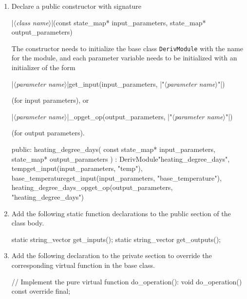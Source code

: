\documentclass{article}\usepackage[]{graphicx}\usepackage[]{color}
\newcommand{\code}[1]{\lstinline[style=C++style]{#1}}
\newcommand{\placeholder}[1]{$\langle$\textrm{\textit{#1}}$\rangle$}
\newcommand{\stringplaceholder}[1]{{\color{stringcolor}"$\langle$\textrm{\textit{#1}}$\rangle$"}}
\begin{document}
\begin{enumerate}
\begin{example}[4]
       // Pointers to output parameters:
       double* heating_degree_days_op;
  \end{example}

\item Declare a public constructor with signature
  \begin{C++listing}[4]
    |\placeholder{class name}|(const state_map* input_parameters, state_map* output_parameters)
  \end{C++listing}
  The constructor needs to initialize the base class
  \code{DerivModule} with the name for the module, and each parameter
  variable needs to be initialized with an initializer of the form
  \begin{C++listing}[4]
    |\placeholder{parameter name}|{get_input(input_parameters, |\stringplaceholder{parameter name}|)}
  \end{C++listing}
  (for input parameters), or
  \begin{C++listing}[4]
    |\placeholder{parameter name}|_op{get_op(output_parameters, |\stringplaceholder{parameter name}|)}
  \end{C++listing}
  (for output parameters).

  \begin{example}[4]
    public:
       heating_degree_days(
           const state_map*
               input_parameters,
           state_map*
               output_parameters
       )
       : DerivModule{"heating_degree_days"},
         temp{get_input(input_parameters, "temp")},
         base_temperature{get_input(input_parameters, "base_temperature")},
         heating_degree_days_op{get_op(output_parameters, "heating_degree_days")}
       {}
  \end{example}

\item Add the following static function declarations to the public
  section of the class body.
  \begin{example}[4]
    static string_vector get_inputs();
    static string_vector get_outputs();
  \end{example}

\item Add the following declaration to the private section to override
  the corresponding virtual function in the base class.
  \begin{example}[4]
    // Implement the pure virtual function do_operation():
    void do_operation() const override final;
  \end{example}


\end{enumerate}
\end{document}
